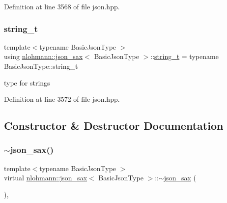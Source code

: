Definition at line 3568 of file json.\+hpp.

\mbox{\label{structnlohmann_1_1json__sax_ae01977a9f3c5b3667b7a2929ed91061e}} 
\subsubsection{\texorpdfstring{string\+\_\+t}{string\_t}}
{\footnotesize\ttfamily template$<$typename Basic\+Json\+Type $>$ \\
using \hyperlink{structnlohmann_1_1json__sax}{nlohmann\+::json\+\_\+sax}$<$ Basic\+Json\+Type $>$\+::\hyperlink{structnlohmann_1_1json__sax_ae01977a9f3c5b3667b7a2929ed91061e}{string\+\_\+t} =  typename Basic\+Json\+Type\+::string\+\_\+t}



type for strings 



Definition at line 3572 of file json.\+hpp.



\subsection{Constructor \& Destructor Documentation}
\mbox{\label{structnlohmann_1_1json__sax_af31bacfa81aa7818d8639d1da65c8eb5}} 
\subsubsection{\texorpdfstring{$\sim$json\+\_\+sax()}{~json\_sax()}}
{\footnotesize\ttfamily template$<$typename Basic\+Json\+Type $>$ \\
virtual \hyperlink{structnlohmann_1_1json__sax}{nlohmann\+::json\+\_\+sax}$<$ Basic\+Json\+Type $>$\+::$\sim$\hyperlink{structnlohmann_1_1json__sax}{json\+\_\+sax} (\begin{DoxyParamCaption}{ }\end{DoxyParamCaption})\hspace{0.3cm}{\ttfamily [virtual]}, {\ttfamily [default]}}



